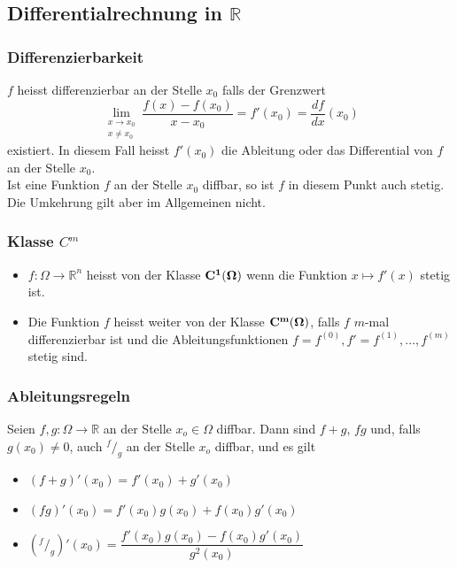 \documentclass[6pt]{article}
\begin{document}
\begin{multicols*}{3}
\pagebreak
\subsection*{Differentialrechnung in $\mathbb{R}$}
	
	\subsubsection*{Differenzierbarkeit}
	$f$ heisst differenzierbar an der Stelle $x_0$ falls der Grenzwert
	\begin{equation*}
		\lim_{\substack{x \to x_0 \\ x \neq x_0}} \frac{f(x) - f(x_0)}{x-x_0} = f'(x_0) = \frac{df}{dx}(x_0)
	\end{equation*}
		existiert. In diesem Fall heisst $f'(x_0)$ die Ableitung oder das Differential von $f$ an der Stelle $x_0$.\\
		
		Ist eine Funktion $f$ an der Stelle $x_0$ diffbar, so ist $f$ in diesem Punkt auch stetig. Die Umkehrung gilt aber im Allgemeinen nicht.

	\subsubsection*{Klasse $C^m$}
	\begin{itemize}[itemsep=2pt, parsep=3pt]

		\item 	$f : \Omega \to \mathbb{R}^n$ heisst von der Klasse ${\bf C^1(\Omega)}$ wenn die Funktion $ x \mapsto f'(x)$ stetig ist.
		\item Die Funktion $f$ heisst weiter 
		von der Klasse ${\bf C^m(\Omega)}$, falls $f$ $m$-mal differenzierbar ist und die Ableitungsfunktionen $f = f^{(0)}, f' = f^{(1)}, \ldots, f^{(m)}$ stetig sind.
	\end{itemize}


	\subsubsection*{Ableitungsregeln}
		Seien $f,g:\Omega \to \mathbb{R}$ an der Stelle $x_o \in \Omega$ diffbar. Dann sind $f+g$, $f g$ und, falls $g(x_0) \neq 0$, auch $^f/_g$ an
		der Stelle $x_o$ diffbar, und es gilt
		\begin{itemize}
			\item $(f+g)'(x_0) = f'(x_0) + g'(x_0)$
			\item $(f g)'(x_0) = f'(x_0) g(x_0) + f(x_0) g'(x_0)$
			\item $(^f/_g)'(x_0) = \dfrac{f'(x_0) g(x_0) - f(x_0) g'(x_0)}{g^2(x_0)}$
		\end{itemize}
		

\end{multicols*}
\end{document}
